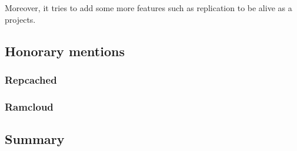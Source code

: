Moreover, it tries to add some more features such as replication
to be alive as a projects.

\subsection{Honorary mentions}

\subsubsection{Repcached}

\subsubsection{Ramcloud}

\subsection{Summary}





